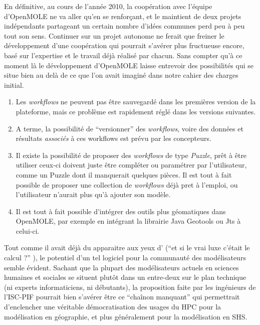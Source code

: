 En définitive, au cours de l'année 2010, la coopération avec l'équipe d'OpenMOLE ne va aller qu'en se renforçant, et le maintient de deux projets indépendants partageant un certain nombre d'idées communes perd peu à peu tout son sens. Continuer sur un projet autonome ne ferait que freiner le développement d'une coopération qui pourrait s'avérer plus fructueuse encore, basé sur l'expertise et le travail déjà réalisé par chacun. Sans compter qu'à ce moment là le développement d'OpenMOLE laisse entrevoir des possibilités qui se situe bien au delà de ce que l'on avait imaginé dans notre cahier des charges initial.

\begin{enumerate}[label=(\alph*),labelindent=\parindent,leftmargin=*]
\item Les \textit{workflows} ne peuvent pas être sauvegardé dans les premières version de la plateforme, mais ce problème est rapidement réglé dans les versions suivantes.
\item A terme, la possibilité de \enquote{versionner}  des \textit{workflows}, voire des données et résultats \textit{associés} à ces workflows est prévu par les concepteurs.
\item Il existe la possibilité de proposer des \textit{workflows} de type \textit{Puzzle}, prêt à être utiliser ceux-ci doivent juste être compléter ou paramétrer par l'utilisateur, comme un Puzzle dont il manquerait quelques pièces. Il est tout à fait possible de proposer une collection de \textit{workflows} déjà pret à l'emploi, ou l'utilisateur n'aurait plus qu'à ajouter son modèle.
\item Il est tout à fait possible d'intégrer des outils plus géomatiques dans OpenMOLE, par exemple en intégrant la librairie Java Geotools ou Jts à celui-ci.
\end{enumerate}

Tout comme il avait déjà du apparaitre aux yeux d'\textcite[19-26]{Banos2013} (\enquote{et si le vrai luxe c'était le calcul ?} ), le potentiel d'un tel logiciel pour la communauté des modélisateurs semble évident. Sachant que la plupart des modélisateurs actuels en sciences humaines et sociales se situent plutôt dans un entre-deux sur le plan technique (ni experts informaticiens, ni débutants), la proposition faite par les ingénieurs de l'ISC-PIF pourrait bien s'avérer être ce \enquote{chaînon manquant} qui permettrait d'enclencher une véritable démocratisation des usages du HPC pour la modélisation en géographie, et plus généralement pour la modélisation en SHS.

